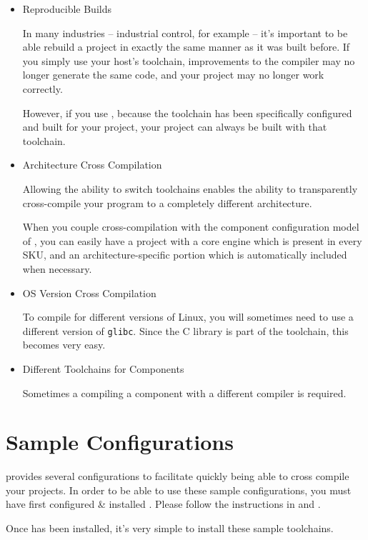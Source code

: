 \begin{itemize}
\item Reproducible Builds

  In many industries -- industrial control, for example -- it's
  important to be able rebuild a project in exactly the same manner
  as it was built before.  If you simply use your host's toolchain,
  improvements to the compiler may no longer generate the same code,
  and your project may no longer work correctly.

  However, if you use \lmsbw, because the toolchain has been
  specifically configured and built for your project, your project can
  always be built with that toolchain.

\item Architecture Cross Compilation

  Allowing the ability to switch toolchains enables the ability to
  transparently cross-compile your program to a completely different
  architecture.

  When you couple cross-compilation with the component configuration
  model of \lmsbw, you can easily have a project with a core engine
  which is present in every SKU, and an architecture-specific portion
  which is automatically included when necessary.

\item OS Version Cross Compilation

  To compile for different versions of Linux, you will sometimes need
  to use a different version of \texttt{glibc}.  Since the C library
  is part of the toolchain, this becomes very easy.

\item Different Toolchains for Components

  Sometimes a compiling a component with a different compiler is
  required.
\end{itemize}

\section{Sample Configurations}

\lmsbw provides several \ctng configurations to facilitate quickly
being able to cross compile your projects.  In order to be able to use
these sample configurations, you must have first configured \&
installed \ctng.  Please follow the instructions
in 
and .

Once \ctng has been installed, it's very simple to install these
sample toolchains.

